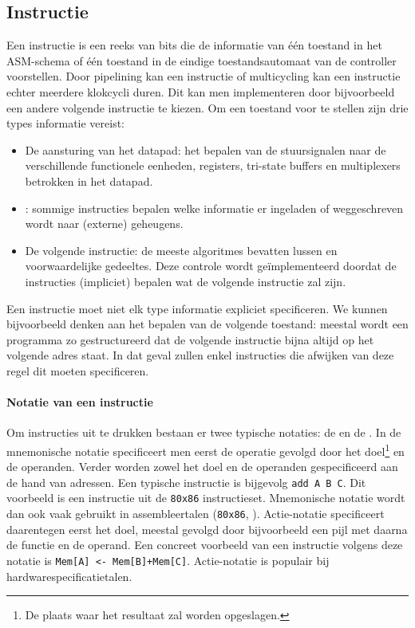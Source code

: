 \subsection{Instructie}
Een instructie is een reeks van bits die de informatie van \'e\'en toestand in het ASM-schema of \'e\'en toestand in de eindige toestandsautomaat van de controller voorstellen. Door pipelining kan een instructie of multicycling kan een instructie echter meerdere klokcycli duren. Dit kan men implementeren door bijvoorbeeld een andere volgende instructie te kiezen. Om een toestand voor te stellen zijn drie types informatie vereist:
\begin{itemize}
 \item De aansturing van het datapad: het bepalen van de stuursignalen naar de verschillende functionele eenheden, registers, tri-state buffers en multiplexers betrokken in het datapad.
 \item {}: sommige instructies bepalen welke informatie er ingeladen of weggeschreven wordt naar (externe) geheugens.
 \item De volgende instructie: de meeste algoritmes bevatten lussen en voorwaardelijke gedeeltes. Deze controle wordt ge\"implementeerd doordat de instructies (impliciet) bepalen wat de volgende instructie zal zijn.
\end{itemize}
Een instructie moet niet elk type informatie expliciet specificeren. We kunnen bijvoorbeeld denken aan het bepalen van de volgende toestand: meestal wordt een programma zo gestructureerd dat de volgende instructie bijna altijd op het volgende adres staat. In dat geval zullen enkel instructies die afwijken van deze regel dit moeten specificeren.
\paragraph{Notatie van een instructie}
Om instructies uit te drukken bestaan er twee typische notaties: de  en de . In de mnemonische notatie specificeert men eerst de operatie gevolgd door het doel\footnote{De plaats waar het resultaat zal worden opgeslagen.} en de operanden. Verder worden zowel het doel en de operanden gespecificeerd aan de hand van adressen. Een typische instructie is bijgevolg \verb+add A B C+. Dit voorbeeld is een instructie uit de \verb+80x86+ instructieset. Mnemonische notatie wordt dan ook vaak gebruikt in assembleertalen (\verb+80x86+, ). Actie-notatie specificeert daarentegen eerst het doel, meestal gevolgd door bijvoorbeeld een pijl met daarna de functie en de operand. Een concreet voorbeeld van een instructie volgens deze notatie is \verb/Mem[A] <- Mem[B]+Mem[C]/. Actie-notatie is populair bij hardwarespecificatietalen.
